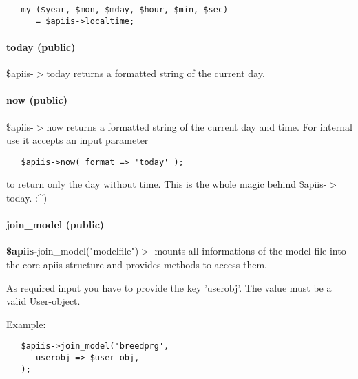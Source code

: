 \begin{verbatim}
   my ($year, $mon, $mday, $hour, $min, $sec)
      = $apiis->localtime;
\end{verbatim}
\paragraph*{today (public)\label{Apiis::Init_--_Basic_initialisation_object_for_the_complete_APIIS_structure_today_public_}}


\$apiis-$>$today returns a formatted string of the current day.

\paragraph*{now (public)\label{Apiis::Init_--_Basic_initialisation_object_for_the_complete_APIIS_structure_now_public_}}


\$apiis-$>$now returns a formatted string of the current day and time.
For internal use it accepts an input parameter

\begin{verbatim}
   $apiis->now( format => 'today' );
\end{verbatim}


to return only the day without time. This is the whole magic behind
\$apiis-$>$today. :\^{})

\paragraph*{join\_model (public)\label{Apiis::Init_--_Basic_initialisation_object_for_the_complete_APIIS_structure_join_model_public_}}


\textbf{\$apiis-}join\_model("modelfile")$>$ mounts all informations of the model file
into the core apiis structure and provides methods to access them.



As required input you have to provide the key 'userobj'. The value must be a
valid User-object.



Example:

\begin{verbatim}
   $apiis->join_model('breedprg',
      userobj => $user_obj,
   );
\end{verbatim}


